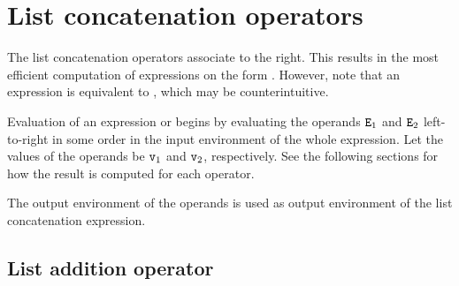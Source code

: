 
\section{List concatenation operators}

\label{section:listconc-exprs}

The list concatenation operators associate to the right.  This results in the most
efficient computation of expressions on the form .  However, note that an expression  is equivalent to , which may be counterintuitive.

\SYNTAX

\begin{rules}
       {   \OR
        }

\end{rules}

\EVALUATION

Evaluation of an expression  or
 begins by evaluating
the operands ${\tt{\sl E}}_1$ and ${\tt{\sl E}}_2$
\ifStd left-to-right \fi \ifOld in some order \fi
in the input
environment of the whole expression.  Let the values of the operands
be ${\tt{\sl v}}_1$ and ${\tt{\sl v}}_2$, respectively.
See the following sections for how the result is computed for each
operator.

\ENVIRONMENTS

The output environment of the operands is used as output environment of
the list concatenation expression.

\subsection{List addition operator \T{++}}

\label{section:list-addition}


